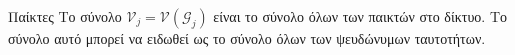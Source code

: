 {}
\begin{definitiongr}{Παίκτες}
  Το σύνολο $\mathcal{V}_j = \mathcal{V}\left(\mathcal{G}_j\right)$ είναι το σύνολο όλων των παικτών στο δίκτυο. Το σύνολο
  αυτό μπορεί να ειδωθεί ως το σύνολο όλων των ψευδώνυμων ταυτοτήτων.
\end{definitiongr}
